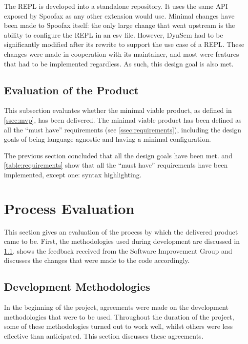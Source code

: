 The REPL is developed into a standalone repository. It uses the same API exposed
by Spoofax as any other extension would use. Minimal changes have been made to
Spoofax itself: the only large change that went upstream is the ability to
configure the REPL in an esv file. However, DynSem had to be significantly
modified after its rewrite to support the use case of a REPL. These changes were
made in cooperation with its maintainer, and most were features that had to be
implemented regardless. As such, this design goal is also met.

\subsection{Evaluation of the Product}
\label{ssec:eval-product}

This subsection evaluates whether the minimal viable product, as defined in
\cref{ssec:mvp}, has been delivered. The minimal viable product has been defined
as all the ``must have'' requirements (see \cref{ssec:requirements}), including
the design goals of being language-agnostic and having a minimal configuration.

The previous section concluded that all the design goals have been met.
 and \cref{table:requirements} show that all the
``must have'' requirements have been implemented, except one: syntax
highlighting.


\section{Process Evaluation}
\label{sec:process-evaluation}

This section gives an evaluation of the process by which the delivered product
came to be. First, the methodologies used during development are discussed in
\cref{ssec:dev-meth}.  shows the feedback received from the
Software Improvement Group and discusses the changes that were made to the code
accordingly.

\subsection{Development Methodologies}
\label{ssec:dev-meth}

In the beginning of the project, agreements were made on the development
methodologies that were to be used. Throughout the duration of the project, some
of these methodologies turned out to work well, whilst others were less
effective than anticipated. This section discusses these agreements.

